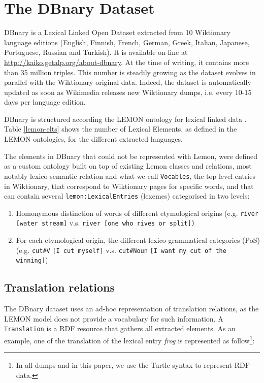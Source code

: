 \documentclass[10pt, a4paper]{article}
\begin{document}
\section{The DBnary Dataset}

DBnary is a Lexical Linked Open Dataset extracted from 10 Wiktionary language editions (English, Finnish, French, German, Greek, Italian, Japanese, Portuguese, Russian and Turkish). It is available on-line at \url{http://kaiko.getalp.org/about-dbnary}. At the time of writing, it contains more than 35 million triples. This number is steadily growing as the dataset evolves in parallel with the Wiktionary original data. Indeed, the dataset is automatically updated as soon as Wikimedia releases new Wiktionary dumps, i.e. every 10-15 days per language edition. 

DBnary is structured according the LEMON ontology for lexical linked data \cite{DBLP:conf/esws/McCraeSC11}. Table \ref{lemon-elts} shows the number of Lexical Elements, as defined in the LEMON ontologies, for the different extracted languages. 

The elements in DBnary that could not be represented with Lemon, were defined as a custom ontology built on top of existing Lemon classes and relations, most notably lexico-semantic relation and what we call \verb|Vocables|, the top level entries in Wiktionary, that correspond to Wiktionary pages for specific words, and that can contain several \verb|lemon:LexicalEntries| (lexemes) categorised in two levels:
\begin{enumerate}
	\item Homonymous distinction of words of different etymological origins (e.g. \verb|river [water stream]| v.s. \verb|river [one who rives or split])|
	\item For each etymological origin, the different lexico-grammatical categories (PoS) (e.g. \verb|cut#V| \verb|[I cut myself]| v.s. \verb|cut#Noun| \verb|[I want my cut of the winning]|)
\end{enumerate}

\subsection{Translation relations}

The DBnary dataset uses an ad-hoc representation of translation relations, as the LEMON model does not provide a vocabulary for such information. A \verb|Translation| is a RDF resource that gathers all extracted elements. As an example, one of the translation of the lexical entry \emph{frog} is represented as follow\footnote{In all dumps and in this paper, we use the Turtle syntax to represent RDF data.}:
\end{document}
